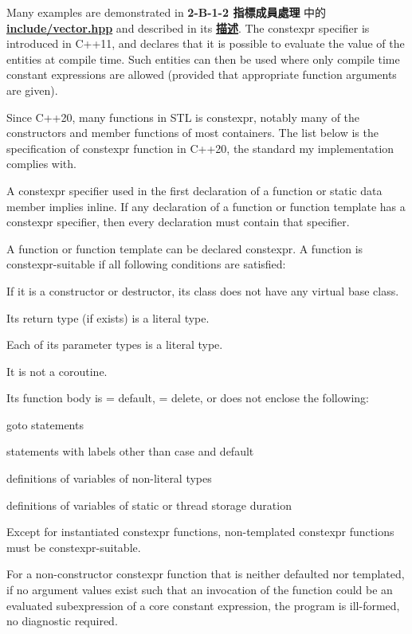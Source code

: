 \documentclass[a4paper,12pt]{article}
\begin{document}
Many examples are demonstrated in \textbf{2-B-1-2 指標成員處理} 中的 \hyperref[vector-list]{\textbf{include/vector.hpp}} and described in its \hyperref[vector-describe]{\textbf{描述}}.
\label{constexpr}
The constexpr specifier is introduced in C++11, and declares that it is possible to evaluate the value of the entities at compile time. Such entities can then be used where only compile time constant expressions are allowed (provided that appropriate function arguments are given).

Since C++20, many functions in STL is constexpr, notably many of the constructors and member functions of most containers. The list below is the specification of constexpr function in C++20, the standard my implementation complies with.
\bit
\item A constexpr specifier used in the first declaration of a function or static data member implies inline. If any declaration of a function or function template has a constexpr specifier, then every declaration must contain that specifier.
\item A function or function template can be declared constexpr. A function is constexpr-suitable if all following conditions are satisfied:
\bit
\item If it is a constructor or destructor, its class does not have any virtual base class.
\item Its return type (if exists) is a literal type.
\item Each of its parameter types is a literal type.
\item It is not a coroutine.
\item Its function body is = default, = delete, or does not enclose the following:
\bit
\item goto statements
\item statements with labels other than case and default
\item definitions of variables of non-literal types
\item definitions of variables of static or thread storage duration
\eit
\eit
\item Except for instantiated constexpr functions, non-templated constexpr functions must be constexpr-suitable.
\item For a non-constructor constexpr function that is neither defaulted nor templated, if no argument values exist such that an invocation of the function could be an evaluated subexpression of a core constant expression, the program is ill-formed, no diagnostic required.
\end{document}
